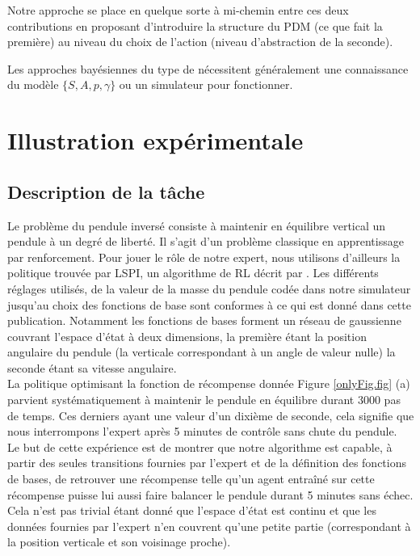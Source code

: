 \documentclass[publibook-draft]{CAp2012}
\begin{document}
Notre approche se place en quelque sorte à mi-chemin entre ces deux contributions en proposant d'introduire la structure du PDM (ce que fait la première) au niveau du choix de l'action (niveau d'abstraction de la seconde).

Les approches bayésiennes du type de \cite{ramachandran2007bayesian, boularias2011relative} nécessitent généralement une connaissance du modèle $\{S,A,p,\gamma\}$ ou un simulateur pour fonctionner.
\section{Illustration expérimentale}
\label{exp.sec}
\subsection{Description de la tâche}
Le problème du pendule inversé consiste à maintenir en équilibre vertical un pendule à un degré de liberté. Il s'agit d'un problème classique en apprentissage par renforcement. Pour jouer le rôle de notre expert, nous utilisons d'ailleurs la politique trouvée par LSPI, un algorithme de RL décrit par \citet{lagoudakis2003least}. Les différents réglages utilisés, de la valeur de la masse du pendule codée dans notre simulateur jusqu'au choix des fonctions de base sont conformes à ce qui est donné dans cette publication. Notamment les fonctions de bases forment un réseau de gaussienne couvrant l'espace d'état à deux dimensions, la première étant la position angulaire du pendule (la verticale correspondant à un angle de valeur nulle) la seconde étant sa vitesse angulaire.\\

La politique optimisant la fonction de récompense donnée Figure \ref{onlyFig.fig} (a) parvient systématiquement à maintenir le pendule en équilibre durant 3000 pas de temps. Ces derniers ayant une valeur d'un dixième de seconde, cela signifie que nous interrompons l'expert après 5 minutes de contrôle sans chute du pendule.\\

Le but de cette expérience est de montrer que notre algorithme est capable, à partir des seules transitions fournies par l'expert et de la définition des fonctions de bases, de retrouver une récompense telle qu'un agent entraîné sur cette récompense puisse lui aussi faire balancer le pendule durant 5 minutes sans échec. Cela n'est pas trivial étant donné que l'espace d'état est continu et que les données fournies par l'expert n'en couvrent qu'une petite partie (correspondant à la position verticale et son voisinage proche).\\
\end{document}
